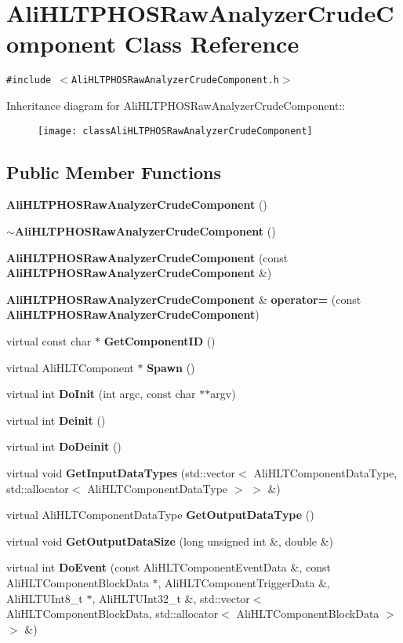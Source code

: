 \section{Ali\-HLTPHOSRaw\-Analyzer\-Crude\-Component Class Reference}
\label{classAliHLTPHOSRawAnalyzerCrudeComponent}
{\tt \#include $<$Ali\-HLTPHOSRaw\-Analyzer\-Crude\-Component.h$>$}

Inheritance diagram for Ali\-HLTPHOSRaw\-Analyzer\-Crude\-Component::\begin{figure}[H]
\begin{center}
\leavevmode
\texttt{[image: classAliHLTPHOSRawAnalyzerCrudeComponent]}
\end{center}
\end{figure}
\subsection*{Public Member Functions}
\begin{CompactItemize}
\item 
{\bf Ali\-HLTPHOSRaw\-Analyzer\-Crude\-Component} ()
\item 
{\bf $\sim$Ali\-HLTPHOSRaw\-Analyzer\-Crude\-Component} ()
\item 
{\bf Ali\-HLTPHOSRaw\-Analyzer\-Crude\-Component} (const {\bf Ali\-HLTPHOSRaw\-Analyzer\-Crude\-Component} \&)
\item 
{\bf Ali\-HLTPHOSRaw\-Analyzer\-Crude\-Component} \& {\bf operator=} (const {\bf Ali\-HLTPHOSRaw\-Analyzer\-Crude\-Component})
\item 
virtual const char $\ast$ {\bf Get\-Component\-ID} ()
\item 
virtual Ali\-HLTComponent $\ast$ {\bf Spawn} ()
\item 
virtual int {\bf Do\-Init} (int argc, const char $\ast$$\ast$argv)
\item 
virtual int {\bf Deinit} ()
\item 
virtual int {\bf Do\-Deinit} ()
\item 
virtual void {\bf Get\-Input\-Data\-Types} (std::vector$<$ Ali\-HLTComponent\-Data\-Type, std::allocator$<$ Ali\-HLTComponent\-Data\-Type $>$ $>$ \&)
\item 
virtual Ali\-HLTComponent\-Data\-Type {\bf Get\-Output\-Data\-Type} ()
\item 
virtual void {\bf Get\-Output\-Data\-Size} (long unsigned int \&, double \&)
\item 
virtual int {\bf Do\-Event} (const Ali\-HLTComponent\-Event\-Data \&, const Ali\-HLTComponent\-Block\-Data $\ast$, Ali\-HLTComponent\-Trigger\-Data \&, Ali\-HLTUInt8\_\-t $\ast$, Ali\-HLTUInt32\_\-t \&, std::vector$<$ Ali\-HLTComponent\-Block\-Data, std::allocator$<$ Ali\-HLTComponent\-Block\-Data $>$ $>$ \&)
\end{CompactItemize}
